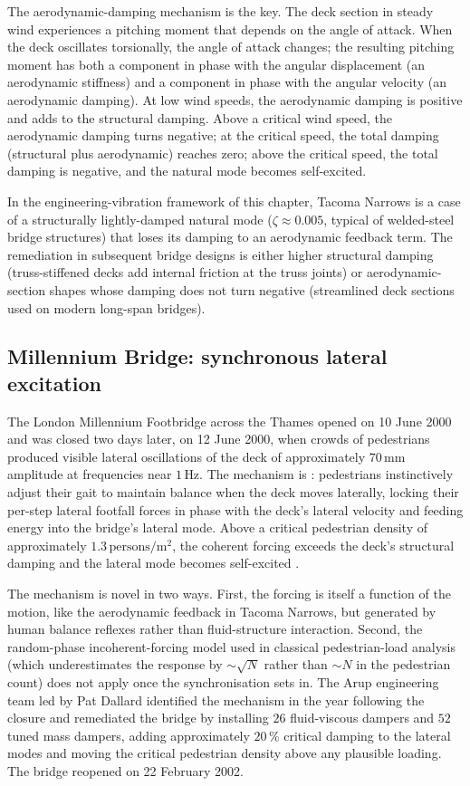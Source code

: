 The aerodynamic-damping mechanism is the key. The deck section in
steady wind experiences a pitching moment that depends on the angle
of attack. When the deck oscillates torsionally, the angle of attack
changes; the resulting pitching moment has both a component in phase
with the angular displacement (an aerodynamic stiffness) and a
component in phase with the angular velocity (an aerodynamic
damping). At low wind speeds, the aerodynamic damping is positive
and adds to the structural damping. Above a critical wind speed, the
aerodynamic damping turns negative; at the critical speed, the
total damping (structural plus aerodynamic) reaches zero; above the
critical speed, the total damping is negative, and the natural mode
becomes self-excited.

In the engineering-vibration framework of this chapter, Tacoma
Narrows is a case of a structurally lightly-damped natural mode
($\zeta \approx 0.005$, typical of welded-steel bridge structures)
that loses its damping to an aerodynamic feedback term. The
remediation in subsequent bridge designs is either higher structural
damping (truss-stiffened decks add internal friction at the truss
joints) or aerodynamic-section shapes whose damping does not turn
negative (streamlined deck sections used on modern long-span
bridges).

\subsection{Millennium Bridge: synchronous lateral excitation}

The London Millennium Footbridge across the Thames opened on 10
June 2000 and was closed two days later, on 12 June 2000, when
crowds of pedestrians produced visible lateral oscillations of the
deck of approximately $70\,\si{\milli\meter}$ amplitude at
frequencies near $1\,\si{\hertz}$. The mechanism is
: pedestrians instinctively
adjust their gait to maintain balance when the deck moves laterally,
locking their per-step lateral footfall forces in phase with the
deck's lateral velocity and feeding energy into the bridge's
lateral mode. Above a critical pedestrian density of approximately
$1.3\,\text{persons}/\si{\meter\squared}$, the coherent forcing
exceeds the deck's structural damping and the lateral mode becomes
self-excited \cite{acc:dallard-millennium-2001}.

The mechanism is novel in two ways. First, the forcing is itself a
function of the motion, like the aerodynamic feedback in Tacoma
Narrows, but generated by human balance reflexes rather than
fluid-structure interaction. Second, the random-phase
incoherent-forcing model used in classical pedestrian-load analysis
(which underestimates the response by $\sim\sqrt{N}$ rather than
$\sim N$ in the pedestrian count) does not apply once the
synchronisation sets in. The Arup engineering team led by Pat Dallard
identified the mechanism in the year following the closure and
remediated the bridge by installing $26$ fluid-viscous dampers and
$52$ tuned mass dampers, adding approximately $20\,\%$ critical
damping to the lateral modes and moving the critical pedestrian
density above any plausible loading. The bridge reopened on 22
February 2002.

